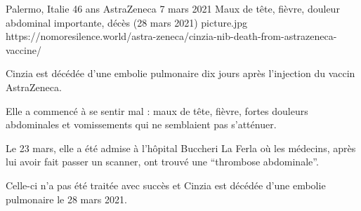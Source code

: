 {Palermo, Italie}
{46 ans}
{AstraZeneca}
{7 mars 2021}
{Maux de tête, fièvre, douleur abdominal importante, décès (28 mars 2021)}
{picture.jpg}
{https://nomoresilence.world/astra-zeneca/cinzia-nib-death-from-astrazeneca-vaccine/}
{

Cinzia est décédée d'une embolie pulmonaire dix jours après l'injection du
vaccin AstraZeneca.

Elle a commencé à se sentir mal : maux de tête, fièvre, fortes douleurs
abdominales et vomissements qui ne semblaient pas s'atténuer.

Le 23 mars, elle a été admise à l'hôpital Buccheri La Ferla où les médecins,
après lui avoir fait passer un scanner, ont trouvé une “thrombose abdominale”.

Celle-ci n'a pas été traitée avec succès et Cinzia est décédée d'une embolie
pulmonaire le 28 mars 2021.

}
